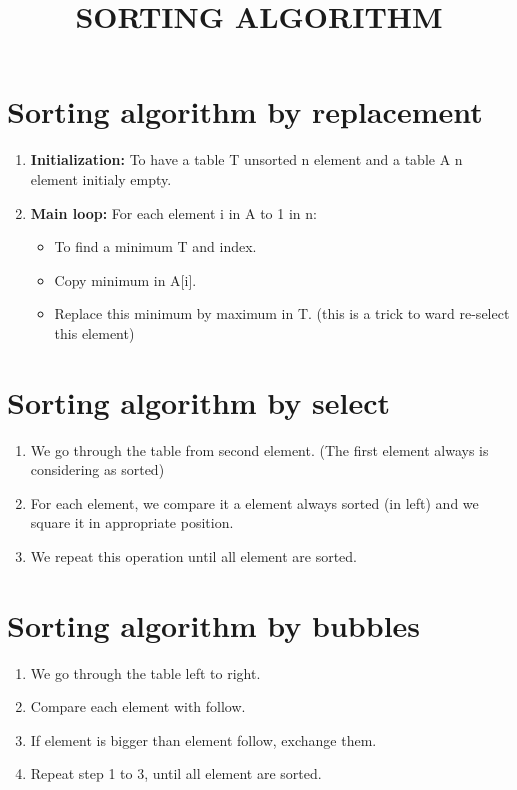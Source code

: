 \documentclass[a4paper, 12pt]{article}
\date{}
\author{}
\title{SORTING ALGORITHM}
\begin{document}
\maketitle

\section{Sorting algorithm by replacement}
\begin{enumerate}
	\item \textbf{Initialization: } To have a table T unsorted n element and a table A n element initialy empty.
	\item \textbf{Main loop: } For each element i in A to 1 in n:
	\begin{itemize}
		\item To find a minimum T and index.
		\item Copy minimum in A[i].
		\item Replace this minimum by maximum in T. (this is a trick  to ward re-select this element)
	\end{itemize}
\end{enumerate}

\section{Sorting algorithm by select}
\begin{enumerate}
	\item We go through the table from second element. (The first element always is considering as sorted)
	\item For each element, we compare it a element always sorted (in left) and we square it in appropriate position.
	\item We repeat this operation until all element are sorted. 
\end{enumerate}

\section{Sorting algorithm by bubbles}
\begin{enumerate}
	\item We go through the table left to right.
	\item Compare each element with follow.
	\item If element is bigger than element follow, exchange them.
	\item Repeat step 1 to 3, until all element are sorted. 
\end{enumerate}
\end{document}
